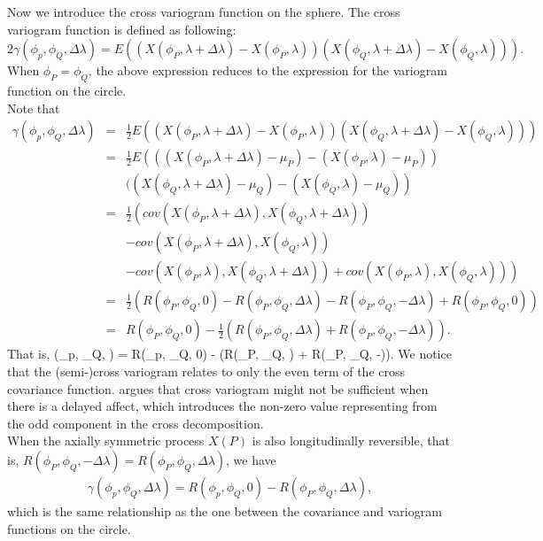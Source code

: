 Now we introduce the cross variogram function on the sphere. The cross variogram function is defined as following:
\[
2\gamma(\phi_p, \phi_Q, \Delta\lambda) = E\left((X(\phi_P, \lambda+\Delta \lambda) - X(\phi_P, \lambda))(X(\phi_Q, \lambda+\Delta \lambda) - X(\phi_Q, \lambda))\right).
\]
When $\phi_P = \phi_Q$, the above expression reduces to the expression for the variogram function on the circle.\\
\noi Note that
\begin{eqnarray*}
\gamma(\phi_p, \phi_Q, \Delta\lambda) &=& \frac{1}{2}E\left((X(\phi_P, \lambda+\Delta \lambda) - X(\phi_P, \lambda))(X(\phi_Q, \lambda+\Delta \lambda) - X(\phi_Q, \lambda))\right) \\
&=& \frac{1}{2} E\left(((X(\phi_P, \lambda+\Delta \lambda) - \mu_P) - (X(\phi_P, \lambda)- \mu_P)) \right. \\
& & \left.((X(\phi_Q, \lambda+\Delta \lambda) - \mu_Q) - (X(\phi_Q, \lambda) - \mu_Q)\right) \\
&=& \frac{1}{2} \left(cov(X(\phi_P, \lambda+\Delta \lambda), X(\phi_Q, \lambda+\Delta \lambda)) \right. \\
& &- \left.cov(X(\phi_P, \lambda+\Delta \lambda), X(\phi_Q, \lambda)) \right. \\
& & \left. - cov(X(\phi_P, \lambda), X(\phi_Q, \lambda + \Delta \lambda)) + cov(X(\phi_P, \lambda), X(\phi_Q, \lambda))  \right) \\
&=& \frac{1}{2} \left(R(\phi_P, \phi_Q, 0) - R(\phi_P, \phi_Q, \Delta \lambda) - R(\phi_P, \phi_Q, -\Delta \lambda) + R(\phi_P, \phi_Q, 0)  \right) \\
&=& R(\phi_P, \phi_Q, 0) - \frac{1}{2}(R(\phi_P, \phi_Q, \Delta \lambda) + R(\phi_P, \phi_Q, -\Delta \lambda)).
\end{eqnarray*}
That is, 				
\beq
\gamma(\phi_p, \phi_Q, \Delta\lambda) =  R(\phi_p, \phi_Q, 0) - (R(\phi_P, \phi_Q, \Delta \lambda) + R(\phi_P, \phi_Q, -\Delta \lambda)).
\eeq
We notice that the (semi-)cross variogram relates to only the even term of the cross covariance function. \cite{Wackernagel2013} argues that cross variogram might not be sufficient when there is a delayed affect, which introduces the non-zero value representing from the odd component in the cross \cov decomposition.\\

When the axially symmetric process $X(P)$ is also longitudinally reversible, that is, $R(\phi_P, \phi_Q, -\Delta \lambda) = R(\phi_P, \phi_Q, \Delta \lambda)$, we have
\begin{eqnarray*}
\gamma(\phi_p, \phi_Q, \Delta\lambda) =  R(\phi_p, \phi_Q, 0) - R(\phi_P, \phi_Q, \Delta \lambda),
\end{eqnarray*}
which is the same relationship as the one between the covariance and variogram functions on the circle.



